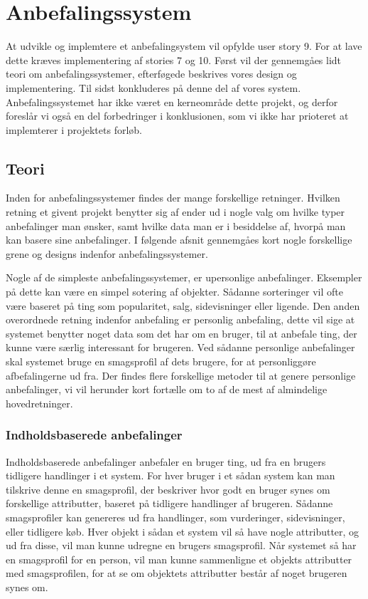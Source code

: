 \section{Anbefalingssystem}\label{anbefaling}
At udvikle og implemtere et anbefalingsystem vil opfylde user story 9.
For at lave dette kræves implementering af stories 7 og 10.
Først vil der gennemgåes lidt teori om anbefalingssystemer, efterføgede beskrives vores design og implementering.
Til sidst konkluderes på denne del af vores system.
Anbefalingssystemet har ikke været en kerneområde dette projekt, og derfor foreslår vi også en del forbedringer i konklusionen, som vi ikke har prioteret at implemterer i projektets forløb.

\subsection{Teori}
Inden for anbefalingssystemer findes der mange forskellige retninger.
Hvilken retning et givent projekt benytter sig af ender ud i nogle valg om hvilke typer anbefalinger man ønsker, samt hvilke data man er i besiddelse af, hvorpå man kan basere sine anbefalinger.
I følgende afsnit gennemgåes kort nogle forskellige grene og designs indenfor anbefalingssystemer.

Nogle af de simpleste anbefalingssystemer, er upersonlige anbefalinger.
Eksempler på dette kan være en simpel sotering af objekter.
Sådanne sorteringer vil ofte være baseret på ting som popularitet, salg, sidevisninger eller ligende.
Den anden overordnede retning indenfor anbefaling er personlig anbefaling, dette vil sige at systemet benytter noget data som det har om en bruger, til at anbefale ting, der kunne være særlig interessant for brugeren.
Ved sådanne personlige anbefalinger skal systemet bruge en smagsprofil af dets brugere, for at personliggøre afbefalingerne ud fra.
Der findes flere forskellige metoder til at genere personlige anbefalinger, vi vil herunder kort fortælle om to af de mest af almindelige hovedretninger\citep{RecommenderSystems}.

\subsubsection{Indholdsbaserede anbefalinger}
Indholdsbaserede anbefalinger anbefaler en bruger ting, ud fra en brugers tidligere handlinger i et system.
For hver bruger i et sådan system kan man tilskrive denne en smagsprofil, der beskriver hvor godt en bruger synes om forskellige attributter, baseret på tidligere handlinger af brugeren.
Sådanne smagsprofiler kan genereres ud fra handlinger, som vurderinger, sidevisninger, eller tidligere køb.
Hver objekt i sådan et system vil så have nogle attributter, og ud fra disse, vil man kunne udregne en brugers smagsprofil.
Når systemet så har en smagsprofil for en person, vil man kunne sammenligne et objekts attributter med smagsprofilen, for at se om objektets attributter består af noget brugeren synes om.

